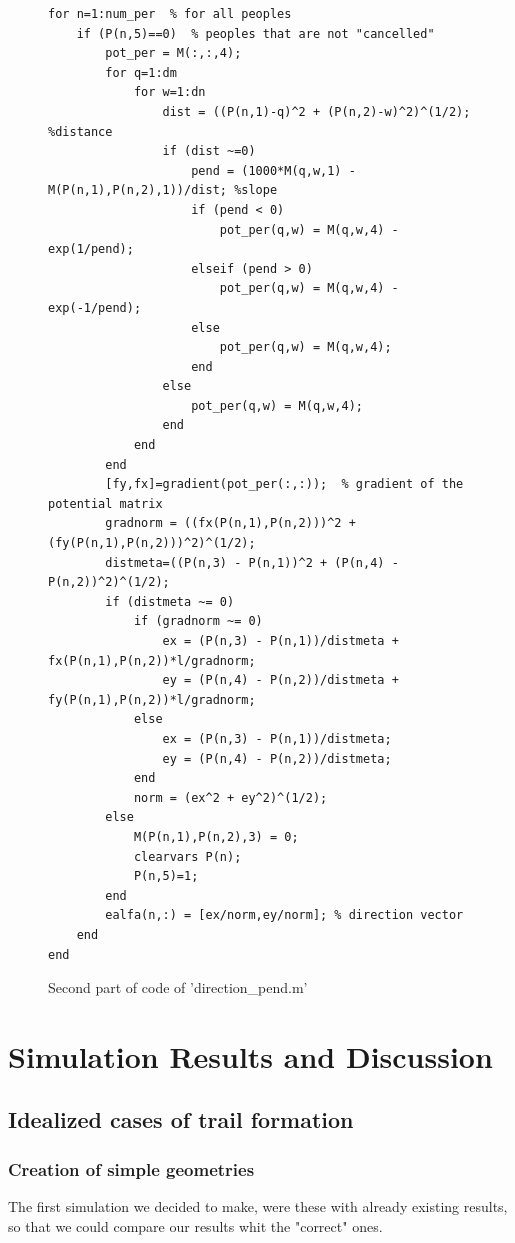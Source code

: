 \documentclass[11pt]{article}
\begin{document}
\begin{figure}[H]
\begin{lstlisting}
for n=1:num_per  % for all peoples
    if (P(n,5)==0)  % peoples that are not "cancelled"
        pot_per = M(:,:,4);
        for q=1:dm
            for w=1:dn
                dist = ((P(n,1)-q)^2 + (P(n,2)-w)^2)^(1/2); %distance
                if (dist ~=0)
                    pend = (1000*M(q,w,1) - M(P(n,1),P(n,2),1))/dist; %slope
                    if (pend < 0)
                        pot_per(q,w) = M(q,w,4) - exp(1/pend);
                    elseif (pend > 0)
                        pot_per(q,w) = M(q,w,4) - exp(-1/pend);
                    else
                        pot_per(q,w) = M(q,w,4);
                    end
                else
                    pot_per(q,w) = M(q,w,4);
                end
            end
        end
        [fy,fx]=gradient(pot_per(:,:));  % gradient of the potential matrix
        gradnorm = ((fx(P(n,1),P(n,2)))^2 + (fy(P(n,1),P(n,2)))^2)^(1/2);
        distmeta=((P(n,3) - P(n,1))^2 + (P(n,4) - P(n,2))^2)^(1/2);
        if (distmeta ~= 0)
            if (gradnorm ~= 0)
                ex = (P(n,3) - P(n,1))/distmeta + fx(P(n,1),P(n,2))*l/gradnorm;
                ey = (P(n,4) - P(n,2))/distmeta + fy(P(n,1),P(n,2))*l/gradnorm;
            else
                ex = (P(n,3) - P(n,1))/distmeta;
                ey = (P(n,4) - P(n,2))/distmeta;
            end
            norm = (ex^2 + ey^2)^(1/2);
        else
            M(P(n,1),P(n,2),3) = 0;
            clearvars P(n);
            P(n,5)=1;
        end
        ealfa(n,:) = [ex/norm,ey/norm]; % direction vector
    end
end
\end{lstlisting}
\caption{Second part of code of 'direction\_pend.m'}
\label{part2}
\end{figure}

\section{Simulation Results and Discussion}
\subsection{Idealized cases of trail formation}
\subsubsection{Creation of simple geometries}

The first simulation we decided to make, were these with already existing results, so that we could compare our results whit the "correct" ones. 
\end{document}
